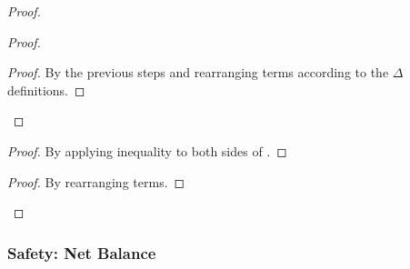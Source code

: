 \documentclass[9pt, oneside]{article}   	%
\begin{document}
\begin{proof}
\begin{proof}
		\qedstep
		\begin{proof}
			By the previous steps and rearranging terms according to the $\Delta$ definitions.
		\end{proof}                      
	\end{proof}

	\begin{proof}
		By applying inequality to both sides of .
	\end{proof}
	
	\qedstep
	\begin{proof}
		By rearranging terms.	
	\end{proof}
\end{proof}

\subsubsection{Safety: Net Balance}
\end{document}
